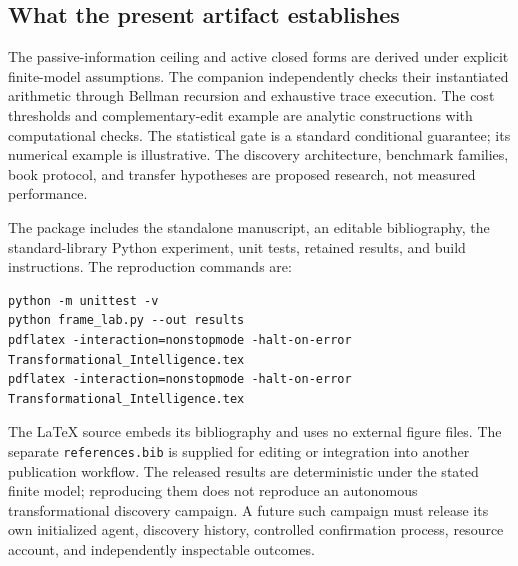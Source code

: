 \documentclass[11pt,letterpaper]{article}
\theoremstyle{remark}\newtheorem{remark}{Remark}[section]
\begin{document}
\subsection{What the present artifact establishes}
The passive-information ceiling and active closed forms are derived under explicit finite-model assumptions. The companion independently checks their instantiated arithmetic through Bellman recursion and exhaustive trace execution. The cost thresholds and complementary-edit example are analytic constructions with computational checks. The statistical gate is a standard conditional guarantee; its numerical example is illustrative. The discovery architecture, benchmark families, book protocol, and transfer hypotheses are proposed research, not measured performance.

The package includes the standalone manuscript, an editable bibliography, the standard-library Python experiment, unit tests, retained results, and build instructions. The reproduction commands are:
\begin{lstlisting}
python -m unittest -v
python frame_lab.py --out results
pdflatex -interaction=nonstopmode -halt-on-error Transformational_Intelligence.tex
pdflatex -interaction=nonstopmode -halt-on-error Transformational_Intelligence.tex
\end{lstlisting}
The LaTeX source embeds its bibliography and uses no external figure files. The separate \texttt{references.bib} is supplied for editing or integration into another publication workflow. The released results are deterministic under the stated finite model; reproducing them does not reproduce an autonomous transformational discovery campaign. A future such campaign must release its own initialized agent, discovery history, controlled confirmation process, resource account, and independently inspectable outcomes.
\end{document}
